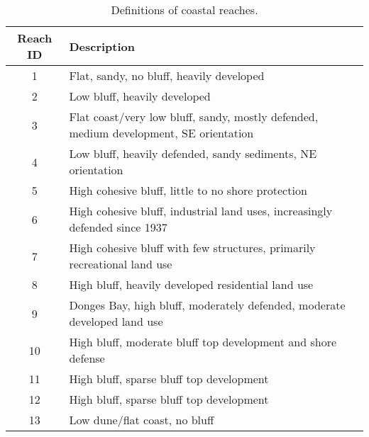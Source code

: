 \begin{table}[htbp]
  \centering
  \setlength{\tabcolsep}{8pt}
  \renewcommand{\arraystretch}{1.15}
  \begin{tabularx}{\textwidth}{c X}
    \toprule
    \textbf{Reach ID} & \textbf{Description} \\
    \midrule
    1  & Flat, sandy, no bluff, heavily developed \\
    2  & Low bluff, heavily developed \\
    3  & Flat coast/very low bluff, sandy, mostly defended, medium development, SE orientation \\
    4  & Low bluff, heavily defended, sandy sediments, NE orientation \\
    5  & High cohesive bluff, little to no shore protection \\
    6  & High cohesive bluff, industrial land uses, increasingly defended since 1937 \\
    7  & High cohesive bluff with few structures, primarily recreational land use \\
    8  & High bluff, heavily developed residential land use \\
    9  & Donges Bay, high bluff, moderately defended, moderate developed land use \\
    10 & High bluff, moderate bluff top development and shore defense \\
    11 & High bluff, sparse bluff top development \\
    12 & High bluff, sparse bluff top development \\
    13 & Low dune/flat coast, no bluff \\
    \bottomrule
  \end{tabularx}
  \caption{Definitions of coastal reaches.}
  \label{tab:tab2.1}
\end{table}
